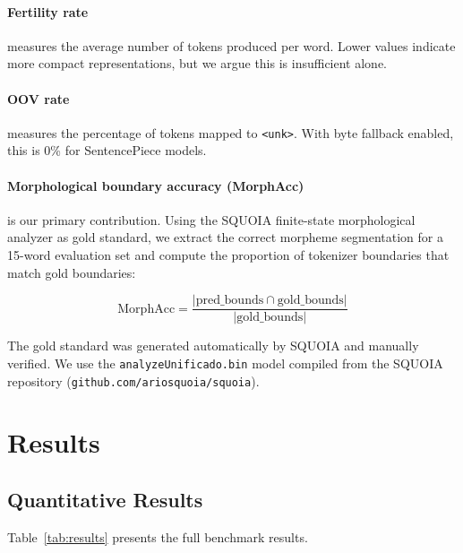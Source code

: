 \documentclass[11pt]{article}
\begin{document}
\paragraph{Fertility rate} measures the average number of tokens produced per word. Lower values indicate more compact representations, but we argue this is insufficient alone.

\paragraph{OOV rate} measures the percentage of tokens mapped to \texttt{<unk>}. With byte fallback enabled, this is 0\% for SentencePiece models.

\paragraph{Morphological boundary accuracy (MorphAcc)} is our primary contribution. Using the SQUOIA finite-state morphological analyzer \cite{rios2016} as gold standard, we extract the correct morpheme segmentation for a 15-word evaluation set and compute the proportion of tokenizer boundaries that match gold boundaries:

\begin{equation}
\text{MorphAcc} = \frac{|\text{pred\_bounds} \cap \text{gold\_bounds}|}{|\text{gold\_bounds}|}
\end{equation}

The gold standard was generated automatically by SQUOIA and manually verified. We use the \texttt{analyzeUnificado.bin} model compiled from the SQUOIA repository (\texttt{github.com/ariosquoia/squoia}).

\section{Results}

\subsection{Quantitative Results}

Table~\ref{tab:results} presents the full benchmark results.
\end{document}
